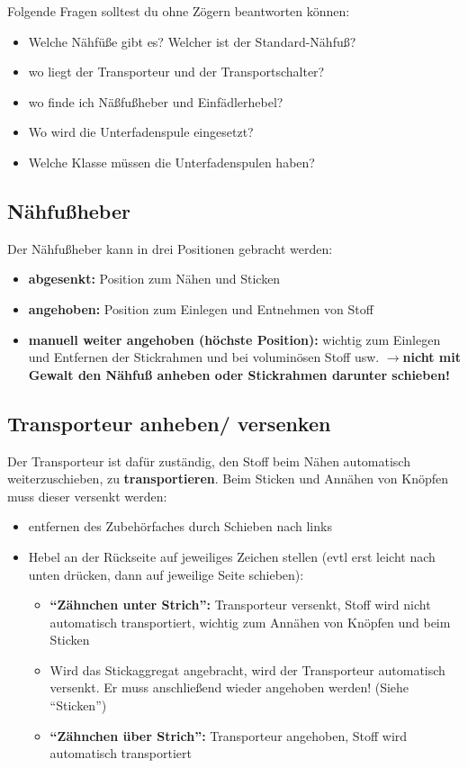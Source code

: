 \documentclass{\basedir/fablab-document}
\newcommand{\pfeil}{\ensuremath{\rightarrow}}
\begin{document}
Folgende Fragen solltest du ohne Zögern beantworten können:
\begin{itemize}
 \item Welche Nähfüße gibt es? Welcher ist der Standard-Nähfuß?
 \item wo liegt der Transporteur und der Transportschalter?
 \item wo finde ich Näßfußheber und Einfädlerhebel?
 \item Wo wird die Unterfadenspule eingesetzt?
 \item Welche Klasse müssen die Unterfadenspulen haben?
\end{itemize}


\subsection{Nähfußheber}
Der Nähfußheber kann in drei Positionen gebracht werden:
\begin{itemize}
 \item \textbf{abgesenkt:} Position zum Nähen und Sticken
 \item \textbf{angehoben:} Position zum Einlegen und Entnehmen von Stoff 
 \item \textbf{manuell weiter angehoben (höchste Position):} wichtig zum Einlegen und Entfernen der Stickrahmen und bei voluminösen Stoff usw. \pfeil \textbf{nicht mit Gewalt den Nähfuß anheben oder Stickrahmen darunter schieben!}
\end{itemize}

\subsection{Transporteur anheben/ versenken}
Der Transporteur ist dafür zuständig, den Stoff beim Nähen automatisch weiterzuschieben, zu \textbf{transportieren}. 
\newline Beim Sticken und Annähen von Knöpfen muss dieser versenkt werden:
\begin{itemize}
 \item entfernen des Zubehörfaches durch Schieben nach links
 \item Hebel an der Rückseite auf jeweiliges Zeichen stellen (evtl erst leicht nach unten drücken, dann auf jeweilige Seite schieben):
	\begin{itemize}
 	 \item \textbf{“Zähnchen unter Strich”:} Transporteur versenkt, Stoff wird nicht automatisch
transportiert, wichtig zum Annähen von Knöpfen und beim Sticken
 	 \item Wird das Stickaggregat angebracht, wird der Transporteur automatisch versenkt. Er muss anschließend wieder angehoben werden! (Siehe “Sticken”)
 	 \item \textbf{“Zähnchen über Strich”:} Transporteur angehoben, Stoff wird automatisch transportiert 
	\end{itemize}
\end{itemize}
\end{document}
